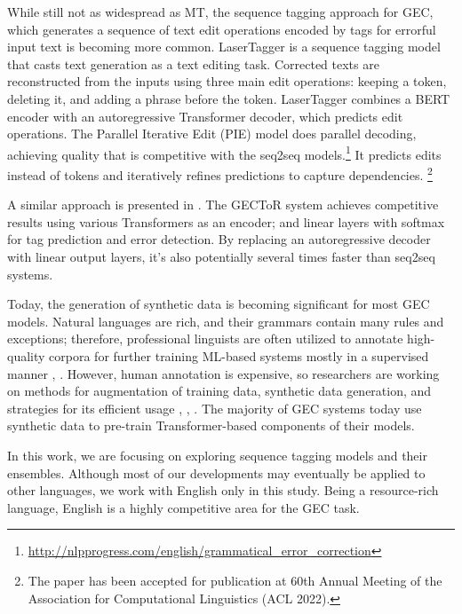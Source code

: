 \documentclass[11pt]{article}
\newcommand\blfootnote[1]{\begingroup
  \renewcommand\thefootnote{}\footnote{#1}\addtocounter{footnote}{-1}\endgroup
}
\begin{document}
While still not as widespread as MT, the sequence tagging approach for GEC, which generates a sequence of text edit operations encoded by tags for errorful input text is becoming more common. LaserTagger \cite{malmi-etal-2019-encode} is a sequence tagging model that casts text generation as a text editing task.  Corrected texts are reconstructed from the inputs using three main edit operations: keeping a token, deleting it, and adding a phrase before the token. LaserTagger combines a BERT encoder with an autoregressive Transformer decoder, which predicts edit operations. The Parallel Iterative Edit (PIE) model \cite{awasthi2019parallel} does parallel decoding, achieving quality that is competitive with the seq2seq models.\footnote{\url{http://nlpprogress.com/english/grammatical_error_correction}} It predicts edits instead of tokens and iteratively refines predictions to capture dependencies.\blfootnote{The paper has been accepted for publication at 60th Annual Meeting of the Association for Computational Linguistics (ACL 2022).} A similar approach is presented in \cite{omelianchuk2020gector}. The GECToR system achieves competitive results using various Transformers as an encoder; and linear layers with softmax for tag prediction and error detection. By replacing an autoregressive decoder with linear output layers, it’s also potentially several times faster than seq2seq systems.

Today, the generation of synthetic data is becoming significant for most GEC models. Natural languages are rich, and their grammars contain many rules and exceptions; therefore, professional linguists are often utilized to annotate high-quality corpora for further training ML-based systems mostly in a supervised manner \cite{dahlmeier2013building}, \cite{bryant2019the}. However, human annotation is expensive, so researchers are working on methods for augmentation of training data, synthetic data generation, and strategies for its efficient usage \cite{lichtarge2019corpora}, \cite{kiyono2019an}, \cite{stahlberg2021synthetic}. The majority of GEC systems today use synthetic data to pre-train Transformer-based components of their models.

In this work, we are focusing on exploring sequence tagging models and their ensembles. Although most of our developments may eventually be applied to other languages, we work with English only in this study. Being a resource-rich language, English is a highly competitive area for the GEC task.
\end{document}
